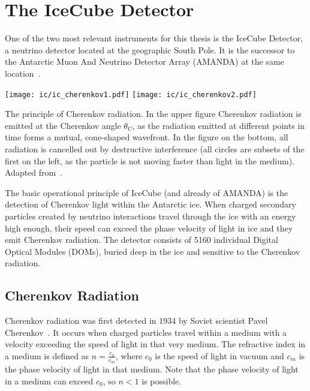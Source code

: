 \chapter{The IceCube Detector}\label{ic}
One of the two most relevant instruments for this thesis is the IceCube Detector, a neutrino detector located at the geographic South Pole. It is the successor to the Antarctic Muon And Neutrino Detector Array (AMANDA) at the same location~.
\begin{marginfigure}
    \texttt{[image: ic/ic\_cherenkov1.pdf]}
    \texttt{[image: ic/ic\_cherenkov2.pdf]}
    \caption[Cherenkov radiation]{The principle of Cherenkov radiation. In the upper figure Cherenkov radiation is emitted at the Cherenkov angle $\theta_\text{C}$, as the radiation emitted at different points in time forms a mutual, cone-shaped wavefront. In the figure on the bottom, all radiation is cancelled out by destructive interference (all circles are subsets of the first on the left, as the particle is not moving faster than light in the medium). Adapted from~\cite{LAnnunziata2020}.}
\end{marginfigure}
The basic operational principle of IceCube (and already of AMANDA) is the detection of Cherenkov light within the Antarctic ice. When charged secondary particles created by neutrino interactions travel through the ice with an energy high enough, their speed can exceed the phase velocity of light in ice and they emit Cherenkov radiation. The detector consists of 5160 individual Digital Optical Modules (DOMs), buried deep in the ice and sensitive to the Cherenkov radiation.

\section{Cherenkov Radiation}\label{cherenkov_radiation}

Cherenkov radiation was first detected in 1934 by Soviet scientist Pavel Cherenkov~. It occurs when charged particles travel within a medium with a velocity exceeding the speed of light in that very medium. The refractive index in a medium is defined as $n=\frac{c_0}{c_m}$, where $c_0$ is the speed of light in vacuum and $c_m$ is the phase velocity of light in that medium. Note that the phase velocity of light in a medium can exceed $c_0$, so $n<1$ is possible.

